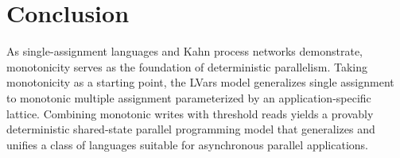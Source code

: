 \chapter{Conclusion}\label{ch:conclusion} %



As single-assignment languages and Kahn process networks demonstrate,
monotonicity serves as the foundation of deterministic parallelism.
Taking monotonicity as a starting point, the LVars model generalizes
single assignment to monotonic multiple assignment parameterized by an
application-specific lattice.  Combining monotonic writes with
threshold reads yields a provably deterministic shared-state parallel
programming model that generalizes and unifies a class of languages
suitable for asynchronous parallel applications.

